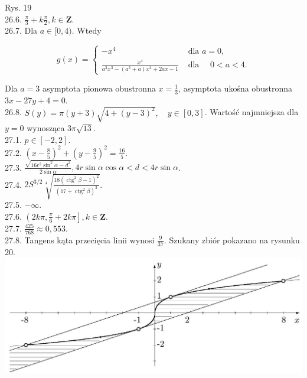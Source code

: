 \documentclass[10pt]{article}
\begin{document}
Rys. 19\\
26.6. $\frac{\pi}{3}+k \frac{\pi}{2}, k \in \mathbf{Z}$.\\
26.7. Dla $a \in[0,4)$. Wtedy

$$
g(x)=\left\{\begin{array}{lll}
-x^{4} & \text { dla } a=0, \\
\frac{x^{4}}{a^{3} x^{3}-\left(a^{2}+a\right) x^{2}+2 a x-1} & \text { dla } \quad 0<a<4 .
\end{array}\right.
$$

Dla $a=3$ asymptota pionowa obustronna $x=\frac{1}{3}$, asymptota ukośna obustronna $3 x-27 y+4=0$.\\
26.8. $S(y)=\pi(y+3) \sqrt{4+(y-3)^{2}}, \quad y \in[0,3]$. Wartość najmniejsza dla $y=0$ wynosząca $3 \pi \sqrt{13}$.\\
27.1. $p \in[-2,2]$.\\
27.2. $\left(x-\frac{8}{5}\right)^{2}+\left(y-\frac{9}{5}\right)^{2}=\frac{16}{5}$.\\
27.3. $\frac{\sqrt{16 r^{2} \sin ^{2} \alpha-d^{2}}}{2 \sin \alpha}, 4 r \sin \alpha \cos \alpha<d<4 r \sin \alpha$.\\
27.4. $2 S^{3 / 2} \sqrt[4]{\frac{18\left(\operatorname{ctg}^{2} \beta-1\right)^{2}}{\left(17+\operatorname{ctg}^{2} \beta\right)^{3}}}$.\\
27.5. $-\infty$.\\
27.6. $\left(2 k \pi, \frac{\pi}{6}+2 k \pi\right], k \in \mathbf{Z}$.\\
27.7. $\frac{425}{768} \approx 0,553$.\\
27.8. Tangens kąta przecięcia linii wynosi $\frac{9}{37}$. Szukany zbiór pokazano na rysunku 20.\\
\includegraphics[max width=\textwidth, center]{2024_11_16_fe5b564401bf7db98894g-074}
\end{document}
